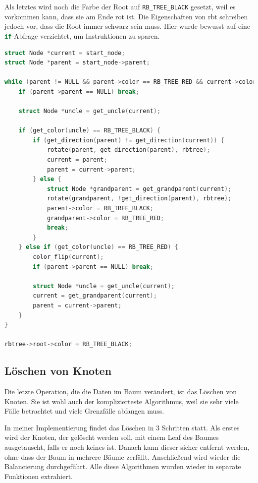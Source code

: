 \documentclass[11pt]{article}
\newcommand{\lstin}[1]{\lstinline[language=C]{#1}}
\begin{document}
Als letztes wird noch die Farbe der Root auf \lstin{RB_TREE_BLACK} gesetzt, weil es vorkommen kann,
dass sie am Ende rot ist. Die Eigenschaften von \gls{rbt} schreiben jedoch vor, dass die Root immer schwarz sein muss.
Hier wurde bewusst auf eine \lstin{if}-Abfrage verzichtet, um Instruktionen zu sparen.

\begin{lstlisting}[language=C]
struct Node *current = start_node;
struct Node *parent = start_node->parent;

while (parent != NULL && parent->color == RB_TREE_RED && current->color == RB_TREE_RED) {
    if (parent->parent == NULL) break;

    struct Node *uncle = get_uncle(current);

    if (get_color(uncle) == RB_TREE_BLACK) {
        if (get_direction(parent) != get_direction(current)) {
            rotate(parent, get_direction(parent), rbtree);
            current = parent;
            parent = current->parent;
        } else {
            struct Node *grandparent = get_grandparent(current);
            rotate(grandparent, !get_direction(parent), rbtree);
            parent->color = RB_TREE_BLACK;
            grandparent->color = RB_TREE_RED;
            break;
        }
    } else if (get_color(uncle) == RB_TREE_RED) {
        color_flip(current);
        if (parent->parent == NULL) break;

        struct Node *uncle = get_uncle(current);
        current = get_grandparent(current);
        parent = current->parent;
    }
}

rbtree->root->color = RB_TREE_BLACK;

\end{lstlisting}

\subsection{Löschen von Knoten}

Die letzte Operation, die die Daten im Baum verändert, ist das Löschen von Knoten.
Sie ist wohl auch der komplizierteste Algorithmus, weil sie sehr viele Fälle betrachtet
und viele Grenzfälle abfangen muss.

In meiner Implementierung findet das Löschen in 3 Schritten statt. Als erstes wird der Knoten, der gelöscht werden soll,
mit einem Leaf des Baumes ausgetauscht, falls er noch keines ist. Danach kann dieser sicher entfernt werden, ohne dass der Baum
in mehrere Bäume zerfällt. Anschließend wird wieder die Balancierung durchgeführt.
Alle diese Algorithmen wurden wieder in separate Funktionen extrahiert.
\end{document}
